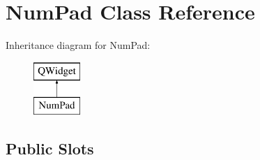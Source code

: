 \hypertarget{class_num_pad}{}\section{Num\+Pad Class Reference}
\label{class_num_pad}
Inheritance diagram for Num\+Pad\+:\begin{figure}[H]
\begin{center}
\leavevmode
\includegraphics[height=2.000000cm]{class_num_pad}
\end{center}
\end{figure}
\subsection*{Public Slots}
